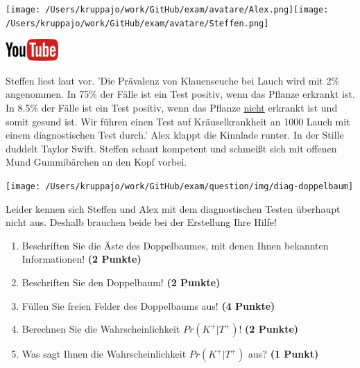 \documentclass[a4paper, 9pt]{scrartcl}\usepackage[]{graphicx}\usepackage[]{xcolor}
\begin{document}
 
\begin{minipage}[t]{0.5\textwidth}
\texttt{[image: /Users/kruppajo/work/GitHub/exam/avatare/Alex.png]}\hspace{-4mm}\texttt{[image: /Users/kruppajo/work/GitHub/exam/avatare/Steffen.png]}
\end{minipage}
\begin{minipage}[t]{0.5\textwidth}
\hfill
\href{https://youtu.be/VQlNl8hvRII}{\includegraphics[width = 2cm]{img/youtube}}
\end{minipage}
\vspace{1ex}



Steffen liest laut vor. 'Die Prävalenz von Klauenseuche bei Lauch wird mit 2\% angenommen. In 75\% der Fälle ist ein Test positiv, wenn das Pflanze erkrankt ist. In 8.5\% der Fälle ist ein Test positiv, wenn das Pflanze \underline{nicht} erkrankt ist und somit gesund ist. Wir führen einen Test auf Kräuselkrankheit an 1000 Lauch mit einem diagnostischen Test durch.' Alex klappt die Kinnlade runter. In der Stille duddelt Taylor Swift. Steffen schaut kompetent und schmeißt sich mit offenen Mund Gummibärchen an den Kopf vorbei.

\begin{center}
  \texttt{[image: /Users/kruppajo/work/GitHub/exam/question/img/diag-doppelbaum]}
\end{center}

Leider kennen sich Steffen und Alex mit dem diagnostischen Testen überhaupt nicht aus. Deshalb brauchen beide bei der Erstellung Ihre Hilfe! 
    
\begin{enumerate}
\item Beschriften Sie die Äste des Doppelbaumes, mit denen Ihnen bekannten Informationen! \textbf{(2 Punkte)}
\item Beschriften Sie den Doppelbaum! \textbf{(2 Punkte)}
\item Füllen Sie freien Felder des Doppelbaums aus! \textbf{(4 Punkte)}
\item Berechnen Sie die Wahrscheinlichkeit $Pr(K^+|T^+)$! \textbf{(2 Punkte)}
\item Was sagt Ihnen die Wahrscheinlichkeit $Pr(K^+|T^+)$ aus? \textbf{(1 Punkt)}
\end{enumerate}
\end{document}
